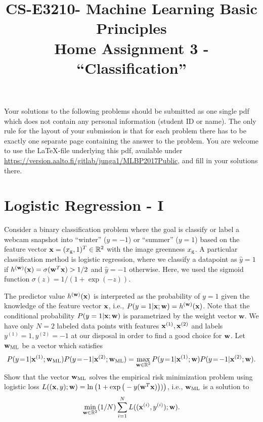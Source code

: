 \documentclass[article,11pt]{article}
\title{CS-E3210- Machine Learning Basic Principles \\ Home Assignment 3 - ``Classification''}
\begin{document}
\date{}
\maketitle

Your solutions to the following problems should be submitted as one single pdf which does not contain 
any personal information (student ID or name).  The only rule for the layout of your submission is that for each 
problem there has to be exactly one separate page containing the answer to the problem. You are welcome to use the \LaTeX-file underlying this pdf, 
available under \url{https://version.aalto.fi/gitlab/junga1/MLBP2017Public}, and fill in your solutions there. 

\newpage

\section{Logistic Regression - I}
Consider a binary classification problem where the goal is classify or label a webcam snapshot into ``winter'' ($y=-1$) or ``summer'' ($y=1$) based on the feature vector 
${\bf x}=(x_{\rm g},1)^{T} \in \mathbb{R}^{2}$ with the image greenness $x_{\rm g}$. A particular classification 
method is logistic regression, where we classify a datapoint as $\hat{y}=1$ if $h^{({\bf w})}({\bf x})=\sigma({\bf w}^T{\bf x}) > 1/2$ and $\hat{y}=-1$ otherwise. Here, we used the sigmoid function 
$\sigma(z) = 1/(1+\exp(-z))$. 

The predictor value $h^{({\bf w})}({\bf x})$ is interpreted as the probability of $y=1$ given the knowledge of the feature vector ${\bf x}$, i.e., $P(y=1|{\bf x};{\bf w}) = h^{({\bf w})}({\bf x})$. Note that 
the conditional probability $P(y=1|{\bf x};{\bf w})$ is parametrized by the weight vector $\mathbf{w}$.
We have only $N=2$ labeled data points with features ${\bf x}^{(1)}, {\bf x}^{(2)}$ and labels $y^{(1)}=1, y^{(2)}=-1$ at our disposal in order to find a good choice for ${\bf w}$. 
Let ${\bf w}_{\rm ML}$ be a vector which satisfies 
\vspace*{-3mm}
\begin{equation} 
P(y\!=\!1|\vx^{(1)};\vw_{\rm ML}) P(y\!=\!-1|\vx^{(2)};\vw_{\rm ML}) = \max_{\vw \in \mathbb{R}^{2}} P(y\!=\!1|\vx^{(1)};\vw) P(y\!=\!-1|\vx^{(2)};\vw). \nonumber
\vspace*{-3mm}
\end{equation} 
Show that the vector ${\bf w}_{\rm ML}$ solves the empirical risk minimization problem using logistic loss $L(({\bf x},y); {\bf w}) = \ln\big(1 + \exp\big(- y ({\bf w}^{T} {\bf x})\big))\big)$, i.e., ${\bf w}_{\rm ML}$ is 
a solution to 
\vspace*{-2mm}
$$\min\limits_{{\bf w} \in \mathbb{R}^{2}} (1/N) \sum_{i=1}^{N} L(({\bf x}^{(i)},y^{(i)}); {\bf w}).$$
\end{document}
